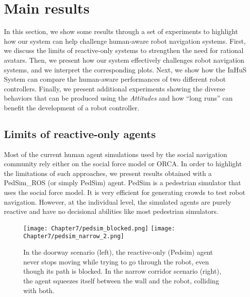 \section{Main results}

In this section, we show some results through a set of experiments to highlight how our system can help challenge human-aware robot navigation systems. First, we discuss the limits of reactive-only systems to strengthen the need for rational avatars. 
Then, we present how our system effectively challenges robot navigation systems, and we interpret the corresponding plots.
Next, we show how the InHuS System can compare the human-aware performances of two different robot controllers.
Finally, we present additional experiments showing the diverse behaviors that can be produced using the \textit{Attitudes} and how ``long runs'' can benefit the development of a robot controller.

\subsection{Limits of reactive-only agents}
\label{sec:pedsim_compare}
Most of the current human agent simulations used by the social navigation community rely either on the social force model or ORCA. In order to highlight the limitations of such approaches, we present results obtained with a PedSim\_ROS (or simply PedSim) agent. PedSim is a pedestrian simulator that uses the social force model. It is very efficient for generating crowds to test robot navigation. However, at the individual level, the simulated agents are purely reactive and have no decisional abilities like most pedestrian simulators. 

\begin{figure}
    \centering
    \texttt{[image: Chapter7/pedsim\_blocked.png]}
    \texttt{[image: Chapter7/pedsim\_narrow\_2.png]}
    \caption{
    In the doorway scenario (left), the reactive-only (Pedsim) agent never stops moving while trying to go through the robot, even though its path is blocked. 
    In the narrow corridor scenario (right), the agent squeezes itself between the wall and the robot, colliding with both. 
    }
    \label{fig:limits_reactive}
    \vspace{-0.3cm}
\end{figure}

